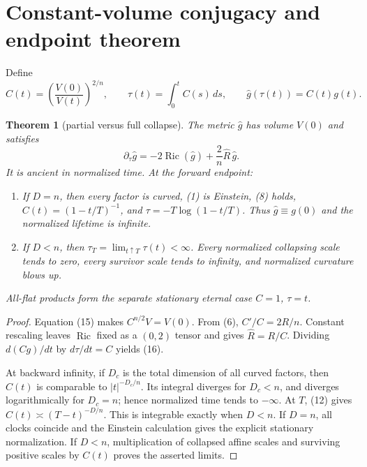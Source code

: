 \documentclass[10pt]{article}
\newtheorem{theorem}{Theorem}
\newcommand{\Ric}{\operatorname{Ric}}
\begin{document}
\section{Constant-volume conjugacy and endpoint theorem}
Define
\begin{equation}
 C(t)=\left(\frac{V(0)}{V(t)}\right)^{2/n},\qquad
 \tau(t)=\int_0^t C(s)\,ds,\qquad
 \widehat g(\tau(t))=C(t)g(t).                            \tag{15}
\end{equation}

\begin{theorem}[partial versus full collapse]\label{thm:norm}
The metric $\widehat g$ has volume $V(0)$ and satisfies
\begin{equation}
 \partial_\tau\widehat g=-2\Ric(\widehat g)
       +\frac2n\widehat R\,\widehat g.                   \tag{16}
\end{equation}
It is ancient in normalized time.  At the forward endpoint:
\begin{enumerate}
\item If $D=n$, then every factor is curved, (1) is Einstein, (8) holds,
      $C(t)=(1-t/T)^{-1}$, and
      $\tau=-T\log(1-t/T)$.  Thus $\widehat g\equiv g(0)$ and the
      normalized lifetime is infinite.
\item If $D<n$, then $\tau_T=\lim_{t\uparrow T}\tau(t)<\infty$.
      Every normalized collapsing scale tends to zero, every survivor scale
      tends to infinity, and normalized curvature blows up.
\end{enumerate}
All-flat products form the separate stationary eternal case $C=1$, $\tau=t$.
\end{theorem}
\begin{proof}
Equation (15) makes $C^{n/2}V=V(0)$.  From (6),
$C'/C=2R/n$.  Constant rescaling leaves $\Ric$ fixed as a $(0,2)$ tensor and
gives $\widehat R=R/C$.  Dividing $d(Cg)/dt$ by $d\tau/dt=C$ yields (16).

At backward infinity, if $D_c$ is the total dimension of all curved factors,
then $C(t)$ is comparable to $|t|^{-D_c/n}$.  Its integral diverges for
$D_c<n$, and diverges logarithmically for $D_c=n$; hence normalized time tends
to $-\infty$.  At $T$, (12) gives
$C(t)\asymp(T-t)^{-D/n}$.  This is integrable exactly when $D<n$.  If
$D=n$, all clocks coincide and the Einstein calculation gives the explicit
stationary normalization.  If $D<n$, multiplication of collapsed affine
scales and surviving positive scales by $C(t)$ proves the asserted limits.
\end{proof}
\fi
\end{document}
